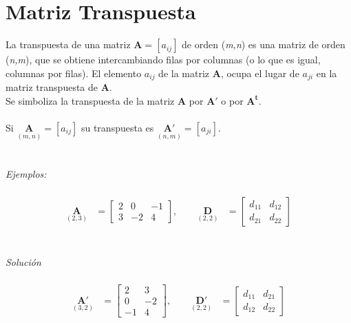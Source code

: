 \documentclass[a4paper,12pt]{report} %
\begin{document}
\section{Matriz Transpuesta}
La transpuesta de una matriz \(\mathbf{A} = \left[\mathit{a_{ij}}\right]\) de orden (\textit{m,n}) es una matriz de orden (\textit{n,m}), que se obtiene intercambiando filas por columnas (o lo que es igual, columnas por filas). El elemento \(\mathit{a_{ij}}\) de la matriz \textbf{A}, ocupa el lugar de \(\mathit{a_{ji}}\) en la matriz transpuesta de \textbf{A}.\\
Se simboliza la transpuesta de la matriz \textbf{A} por \(\mathbf{A'}\) o por \(\mathbf{A^{t}}\).\\ \\ 
Si \(\underset{(m,n)}{\mathbf{A}} = \left[\mathit{a_{ij}}\right]\) su transpuesta es \(\underset{(n,m)}{\mathbf{A'}} = \left[\mathit{a_{ji}}\right]\).
\\ \\ \\
\textit{Ejemplos:} \\ \\
\[
\begin{aligned}
\underset{(2,3)}{\mathbf{A}} &= \begin{bmatrix}
    2 & 0 & -1 \\
    3 & -2 & 4
\end{bmatrix},
\qquad
\underset{(2,2)}{\mathbf{D}} &= \begin{bmatrix}
    \mathit{d_{11}} & \mathit{d_{12}}\\
    \mathit{d_{21}} & \mathit{d_{22}} 
\end{bmatrix}
\end{aligned}
\]\\ \\
\textit{Solución} \\ \\
\[
\begin{aligned}
\underset{(3,2)}{\mathbf{A'}} &= \begin{bmatrix}
    2 & 3 \\
    0 & -2 \\
    -1 & 4 
\end{bmatrix},
\qquad
\underset{(2,2)}{\mathbf{D'}} &= \begin{bmatrix}
    \mathit{d_{11}} & \mathit{d_{21}}\\
    \mathit{d_{12}} & \mathit{d_{22}} 
\end{bmatrix}
\end{aligned}
\]\\
\end{document}
